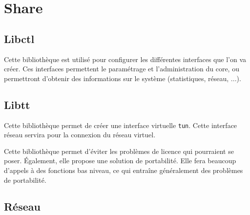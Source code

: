 ﻿\section{Share}
\subsection{Libctl}
Cette bibliothèque est utilisé pour configurer les différentes interfaces que
l'on va créer. Ces interfaces permettent le paramétrage et l'administration
du core, ou permettront d'obtenir des informations sur le système
(statistiques, réseau, ...).

\subsection{Libtt}
Cette bibliothèque permet de créer une interface virtuelle \texttt{tun}.
Cette interface réseau servira pour la connexion du réseau virtuel.

Cette bibliothèque permet d'éviter les problèmes de licence qui pourraient se poser.
Également, elle propose une solution de portabilité. Elle fera beaucoup d'appels à des
fonctions bas niveau, ce qui entraîne généralement des problèmes de portabilité.

\subsection{Réseau}
